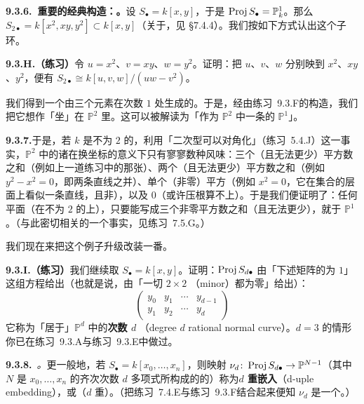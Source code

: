 \textbf{9.3.6.\ 重要的经典构造：\trVeroneseEmbedding。}\quad 设 $S_\bullet=k[x,y]$，于是 $\operatorname{Proj} S_\bullet=\mathbb{P}^1_k$。那么 $S_{2\bullet}=k[x^2,xy,y^2]\subset k[x,y]$（关于\trVeroneseSubring，见 \S7.4.4）。我们按如下方式认出这个子环。

\textbf{9.3.H.（练习）}\quad 令 $u=x^2$、$v=xy$、$w=y^2$。证明：把 $u$、$v$、$w$ 分别映到 $x^2$、$xy$、$y^2$，便有 $S_{2\bullet}\cong k[u,v,w]/(uw-v^2)$。

我们得到一个由三个元素在次数 $1$ 处生成的\trGradedRing。于是，经由\mbox{练习~9.3.F}的构造，我们把它想作「坐」在 $\mathbb{P}^2$ 里。这可以被解读为「作为 $\mathbb{P}^2$ 中一条\trConic{}的 $\mathbb{P}^1$」。

\textbf{9.3.7.}\quad 于是，若 $k$ 是\trCharacteristic{}不为 $2$ 的\trAlgClosedField，利用「二次型可以对角化」（\mbox{练习~5.4.J}）这一事实，$\mathbb{P}^2$ 中的诸\trConic{}在换坐标的意义下只有寥寥数种风味：三个（且无法更少）平方数之和（例如上一道练习中的那张\trConic）、两个（且无法更少）平方数之和（例如 $y^2-x^2=0$，即两条直线之并）、单个（非零）平方（例如 $x^2=0$，它在集合的层面上看似一条直线，且非\trReduced），以及 $0$（或许压根算不上\trConic）。于是我们便证明了：任何平面\trConic（在\trCharacteristic{}不为 $2$ 的\trAlgClosedField{}上），只要能写成三个非零平方数之和（且无法更少），就\trIsomorphic{}于 $\mathbb{P}^1$。（与此密切相关的一个事实，见\mbox{练习~7.5.G}。）

我们现在来把这个例子升级改装一番。

\textbf{9.3.I.（练习）}\quad 我们继续取 $S_\bullet=k[x,y]$。证明：$\operatorname{Proj} S_{d\bullet}$ 由「下述矩阵的\trRank{}为 $1$」这组方程给出（也就是说，由「一切 $2\times2$ \trMinor{}（minor）都为零」给出）：
\[
\begin{pmatrix}
y_0 & y_1 & \cdots & y_{d-1}\\
y_1 & y_2 & \cdots & y_d
\end{pmatrix}
\]
它称为「居于」$\mathbb{P}^d$ 中的\textbf{次数 $d$ \trRationalNormalCurve{}}（degree $d$ rational normal curve）。$d=3$ 的\trTwistedCubic{}情形你已在\mbox{练习~9.3.A}与\mbox{练习~9.3.E}中做过。

\textbf{9.3.8.}\ \emph{\trhDefinition{}。}\quad 更一般地，若 $S_\bullet=k[x_0,\dots,x_n]$，则映射 $\nu_d\colon\operatorname{Proj} S_{d\bullet}\to\mathbb{P}^{N-1}$（其中 $N$ 是 $x_0,\dots,x_n$ 的齐次次数 $d$ 多项式所构成的\trVectorSpace{}的\trDimension）称为\textbf{$d$ 重嵌入}（d-uple embedding），或（$d$ 重）\textbf{\trVeroneseEmbedding}。（把\mbox{练习~7.4.E}与\mbox{练习~9.3.F}结合起来便知 $\nu_d$ 是一个\trClosedEmbedding。）

